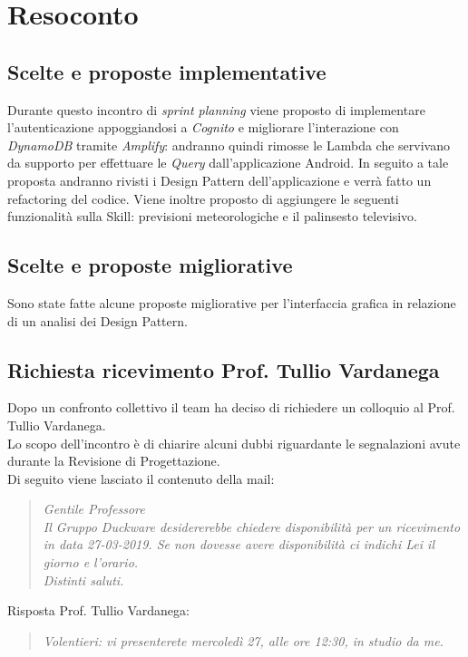 \clearpage
\section{Resoconto}
	\subsection{Scelte e proposte implementative}
	\label{sec:implementazione}
	Durante questo incontro di \textit{sprint planning} viene proposto di implementare l’autenticazione appoggiandosi a \textit{Cognito} e migliorare l’interazione con \textit{DynamoDB} tramite \textit{Amplify}: andranno quindi rimosse le Lambda che servivano da supporto per effettuare le \textit{Query} dall’applicazione Android. In seguito a tale proposta andranno rivisti i Design Pattern dell'applicazione e verrà fatto un refactoring del codice. Viene inoltre proposto di aggiungere le seguenti funzionalità sulla Skill: previsioni meteorologiche e il palinsesto televisivo.
	\subsection{Scelte e proposte migliorative}
	\label{sec:migliorie}
	Sono state fatte alcune proposte migliorative per l'interfaccia grafica in relazione di un analisi dei Design Pattern.
	\subsection{Richiesta ricevimento Prof. Tullio Vardanega}
	\label{sec:ricevimento}
	Dopo un confronto collettivo il team ha deciso di richiedere un colloquio al Prof. Tullio Vardanega.\\
	Lo scopo dell'incontro è di chiarire alcuni dubbi riguardante le segnalazioni avute durante la Revisione di Progettazione.\\
	Di seguito viene lasciato il contenuto della mail:
	\begin{quote}
	\emph{Gentile Professore\\[0.25cm]Il Gruppo Duckware desidererebbe chiedere disponibilità per un ricevimento in data 27-03-2019. Se non dovesse avere disponibilità ci indichi Lei il giorno e l'orario.\\[0.25cm]Distinti saluti.
	}
	\end{quote}
	Risposta Prof. Tullio Vardanega:
	\begin{quote}
	\emph{Volentieri: vi presenterete mercoledì 27, alle ore 12:30, in studio da me.}
	\end{quote}
